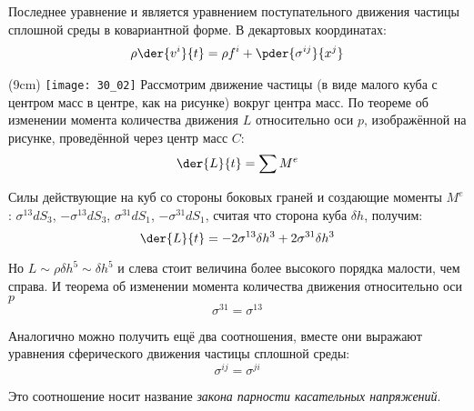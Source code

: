 Последнее уравнение и является уравнением поступательного движения частицы
сплошной среды в ковариантной форме. В декартовых координатах:
    \begin{gather*}
    \rho  \der{v^i}{t}  = \rho f^i + \pder{ \sigma^{ij}}{x^j} 
    \end{gather*}

\sidefig(9cm)
{\texttt{[image: 30\_02]}}{  
Рассмотрим движение частицы (в виде малого куба с центром масс в центре, как на
рисунке) вокруг центра масс. По теореме об изменении момента количества
движения \( L \) относительно оси \( p \), изображённой на рисунке, проведённой
через центр масс \( C \):
\[
    \der{L}{t} = \sum M^e
\]
}

Силы действующие на куб со стороны боковых граней и создающие моменты \( M^e \):
\( \sigma^{13}dS_3 \), \( -\sigma^{13}dS_3 \), \( \sigma^{31}dS_1 \),
\( -\sigma^{31}dS_1 \), считая что сторона куба \( \delta h \), получим:
\[
    \der{L}{t} = -2\sigma^{13}\delta h^3+ 2\sigma^{31}\delta h^3 
\]

Но \(L \sim \rho \delta h^5 \sim \delta h^5\) и слева стоит величина более
высокого порядка малости, чем справа. И теорема об изменении момента количества
движения относительно оси \(p\)
\[
    \sigma^{31} = \sigma^{13}
\]

Аналогично можно получить ещё два соотношения, вместе они выражают уравнения
сферического движения частицы сплошной среды:
\[
    \sigma^{ij} = \sigma^{ji}
\]

Это соотношение носит название \emph{закона парности касательных напряжений}. 

\newpage
